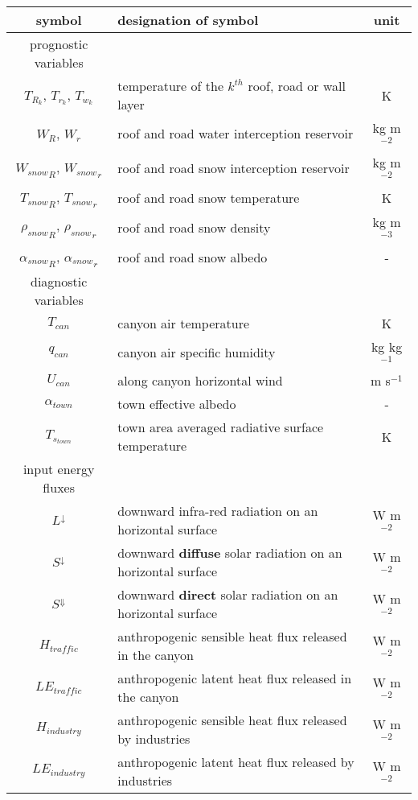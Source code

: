 \clearpage
\begin{table}[h]
{\footnotesize{
\begin{tabular}{||c |l |c||}
\hline
\hline
symbol                             & designation of symbol & unit    \\
\hline
\hline
prognostic variables && \\
\hline
$T_{R_k}$, $T_{r_k}$, $T_{w_k}$  & temperature of the $k^{th}$ roof, road or wall layer & K \\
$W_R$, $W_r$              & roof and road water interception reservoir& kg m$^{-2}$ \\
${W_{snow}}_R$, ${W_{snow}}_r$ & roof and road snow interception reservoir& kg m$^{-2}$ \\
${T_{snow}}_R$, ${T_{snow}}_r$ & roof and road snow temperature& K \\
${\rho_{snow}}_R$, ${\rho_{snow}}_r$ & roof and road snow density& kg m$^{-3}$ \\
${\alpha_{snow}}_R$, ${\alpha_{snow}}_r$ & roof and road snow albedo& -  \\
\hline
diagnostic variables && \\
\hline
$T_{can}$ & canyon air temperature & K \\
$q_{can}$ & canyon air specific humidity & kg kg$^{-1}$ \\
$U_{can}$ & along canyon horizontal wind & m s$^{-1}$ \\
$\alpha_{town}$ & town effective albedo& - \\
$T_{s_{town}}$ & town area averaged radiative surface temperature & K \\
\hline
input energy fluxes && \\
\hline
$L^\downarrow$ & downward infra-red radiation on an horizontal surface  & W m$^{-2}$ \\
$S^\downarrow$ & downward {\bf diffuse} solar radiation on an horizontal surface  & W m$^{-2}$ \\
$S^\Downarrow$ & downward {\bf direct} solar radiation on an horizontal surface  & W m$^{-2}$ \\
$H_{traffic} $ & anthropogenic sensible heat flux released in the canyon & W m$^{-2}$ \\
$LE_{traffic} $ & anthropogenic latent heat flux released in the canyon & W m$^{-2}$ \\
$H_{industry} $ & anthropogenic  sensible heat flux released by industries & W m$^{-2}$ \\
$LE_{industry} $&  anthropogenic latent heat flux released by industries & W m$^{-2}$ \\

\end{tabular}}}
\end{table}
